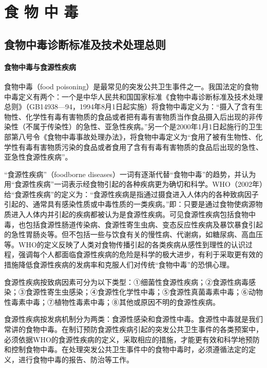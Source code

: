 \protect\hypertarget{text00182.html}{}{}

\chapter{食 物 中 毒}

\section{食物中毒诊断标准及技术处理总则}

\subsubsection{食物中毒与食源性疾病}

食物中毒（food
poisoning）是最常见的突发公共卫生事件之一。我国法定的食物中毒定义有两个：一个是中华人民共和国国家标准《食物中毒诊断标准及技术处理总则》（GB14938---94，1994年8月1日起实施）将食物中毒定义为：“摄入了含有生物性、化学性有毒有害物质的食品或者把有毒有害物质当作食品摄入后出现的非传染性（不属于传染性）的急性、亚急性疾病。”另一个是2000年1月1日起施行的卫生部第八号令《食物中毒事故处理办法》，将食物中毒定义为“食用了被有生物性、化学性有毒有害物质污染的食品或者食用了含有有毒有害物质的食品后出现的急性、亚急性食源性疾病”。

“食源性疾病”（foodborne
diseases）一词有逐渐代替“食物中毒”的趋势，并认为用“食源性疾病”一词表示经食物引起的各种疾病更为确切和科学。WHO（2002年）给“食源性疾病”的定义为：“食源性疾病是指通过摄食进入人体内的各种致病因子引起的、通常具有感染性质或中毒性质的一类疾病。”即：只要是通过食物使病源物质进入人体内并引起的疾病都被认为是食源性疾病。可见食源性疾病包括食物中毒，也包括食源性肠道传染病、食源性寄生虫病、变态反应性疾病及暴饮暴食引起的急性胃肠炎等。但不包括一些与饮食有关的慢性病、代谢病，如糖尿病、高血压等。WHO的定义反映了人类对食物传播引起的各类疾病从感性到理性的认识过程，强调每个人都面临食源性疾病的危险是科学的极大进步，有利于采取更有效的措施降低食源性疾病的发病率和克服人们对传统“食物中毒”的恐惧心理。

食源性疾病按致病因素可分为以下类型：①细菌性食源性疾病；②食源性病毒感染；③食源性寄生虫感染；④食源性化学性中毒；⑤食源性真菌毒素中毒；⑥动物性毒素中毒；⑦植物性毒素中毒；⑧其他或原因不明的食源性疾病。

食源性疾病按发病机制分为两类：食源性感染和食源性中毒。食源性中毒就是我们常讲的食物中毒。在制订预防食源性疾病引起的突发公共卫生事件的各类预案中，必须依据WHO的食源性疾病的定义，采取相应的措施，才能更有效和科学地预防和控制食物中毒。在处理突发公共卫生事件中的食物中毒时，必须遵循法定的定义，进行食物中毒的报告、防治等工作。

